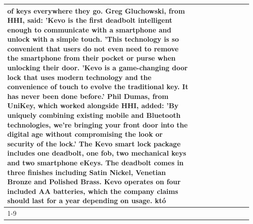 \begin{table}[H]
\begin{tabular}{lllrlllll}
of keys everywhere they go. Greg Gluchowski, from HHI, said: 'Kevo is the first deadbolt intelligent enough to communicate with a smartphone and unlock with a simple touch. 'This technology is so convenient that users do not even need to remove the smartphone from their pocket or purse when unlocking their door. 'Kevo is a game-changing door lock that uses modern technology and the convenience of touch to evolve the traditional key. It has never been done before.' Phil Dumas, from UniKey, which worked alongside HHI, added: 'By uniquely combining existing mobile and Bluetooth technologies, we’re bringing your front door into the digital age without compromising the look or security of the lock.' The Kevo smart lock package includes one deadbolt, one fob, two mechanical keys and two smartphone eKeys. The deadbolt comes in three finishes including Satin Nickel, Venetian Bronze and Polished Brass. Kevo operates on four included AA batteries, which the company claims should last for a year depending on usage. któ \\
\cline{1-9}

\end{tabular}
\end{table}
